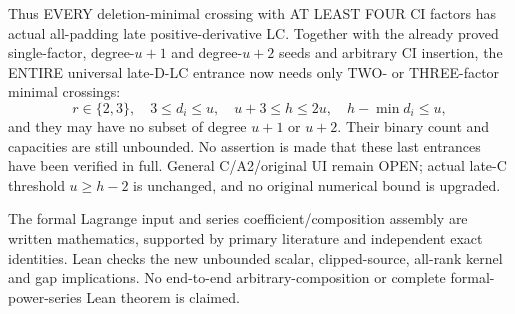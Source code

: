 Thus EVERY deletion-minimal crossing with AT LEAST FOUR CI factors
has actual all-padding late positive-derivative LC. Together with
the already proved single-factor, degree-$u+1$ and degree-$u+2$
seeds and arbitrary CI insertion, the ENTIRE universal late-D-LC
entrance now needs only TWO- or THREE-factor minimal crossings:
\[
 r\in\{2,3\},\quad 3\le d_i\le u,\quad
 u+3\le h\le2u,\quad h-\min d_i\le u,
\]
and they may have no subset of degree $u+1$ or $u+2$.
Their binary count and capacities are still unbounded. No assertion
is made that these last entrances have been verified in full.
General C/A2/original UI remain OPEN; actual late-C threshold
$u\ge h-2$ is unchanged, and no original numerical bound is upgraded.

The formal Lagrange input and series coefficient/composition assembly
are written mathematics, supported by primary literature and independent
exact identities. Lean checks the new unbounded scalar, clipped-source,
all-rank kernel and gap implications. No end-to-end arbitrary-composition
or complete formal-power-series Lean theorem is claimed.

